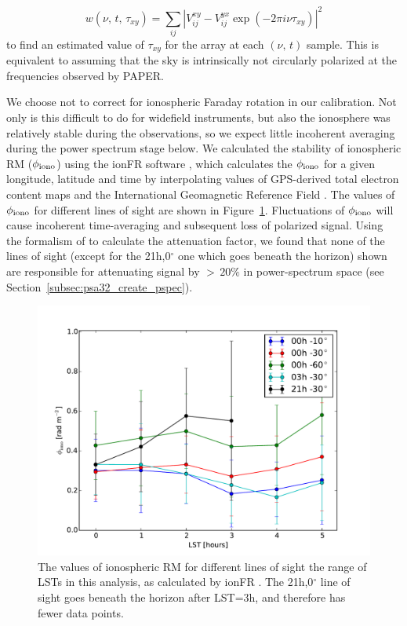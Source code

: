 \begin{equation}
w(\nu,\,t,\,\tau_{xy}) = \sum_{ij} | V_{ij}^{xy} - V_{ij}^{yx}\exp(-2\pi i \nu \tau_{xy}) |^2
\end{equation}
to find an estimated value of $\tau_{xy}$ for the array at each $(\nu,\,t)$ sample. This is equivalent to assuming that the sky is intrinsically not circularly polarized at the frequencies observed by PAPER.

We choose not to correct for ionospheric Faraday rotation in our calibration. Not only is this difficult to do for widefield instruments, but also the ionosphere was relatively stable during the observations, so we expect little incoherent averaging during the power spectrum stage below. We calculated the stability of ionospheric RM ($\phi_{\rm iono}$) using the {\sc ionFR} software \citep{Sotomayor-Beltran.13}, which calculates the $\phi_{\rm iono}$ for a given longitude, latitude and time by interpolating values of GPS-derived total electron content maps and the International Geomagnetic Reference Field \citep{Finlay.10}. The values of $\phi_{\rm iono}$ for different lines of sight are shown in Figure~\ref{fig:psa32img_ionosphere}. 
Fluctuations of $\phi_{\rm iono}$ will cause incoherent time-averaging and subsequent loss of polarized signal. Using the formalism of \citet{Moore.17} to calculate the attenuation factor, we found that none of the lines of sight (except for the 21h,0$^{\circ}$ one which goes beneath the horizon) shown are responsible for attenuating signal by $>\,20\%$ in power-spectrum space (see Section~\ref{subsec:psa32_create_pspec}).

\begin{figure}
\centering
\includegraphics[scale=0.45]{chapters/eor_window_PAPER/figures/ionosphere4casacal_morelines.pdf}
\caption[The values of ionospheric RM for different lines of sight a range of LSTs.]{The values of ionospheric RM for different lines of sight the range of LSTs in this analysis, as calculated by {\sc ionFR} \protect\citep{Sotomayor-Beltran.13}. The 21h,0$^{\circ}$ line of sight goes beneath the horizon after LST=3h, and therefore has fewer data points. }%
\label{fig:psa32img_ionosphere}
\end{figure}


